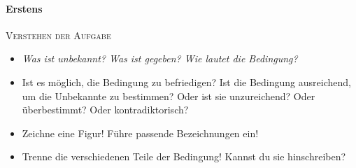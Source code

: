 \begingroup\small

\paragraph{Erstens}\textsc{Verstehen der Aufgabe}
\begin{itemize}
  \renewcommand{\itemsep}{-0.5ex}
  \item \textit{Was ist unbekannt? Was ist gegeben? Wie lautet die Bedingung?}
  \item Ist es möglich, die Bedingung zu befriedigen? Ist die Bedingung ausreichend,
        um die Unbekannte zu bestimmen? Oder ist sie unzureichend? Oder überbestimmt?
        Oder kontradiktorisch?
  \item Zeichne eine Figur! Führe passende Bezeichnungen ein!
  \item Trenne die verschiedenen Teile der Bedingung! Kannst du sie hinschreiben?
\end{itemize}

